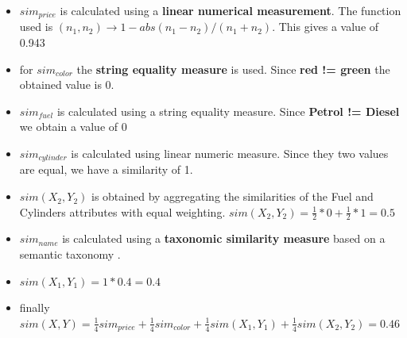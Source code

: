     \begin{itemize}
        \item $sim_{price}$ is calculated using a \textbf{linear numerical measurement}. The function used is $(n_1, n_2) \rightarrow 1 - abs(n_1 - n_2) / (n_1 + n_2)$. This gives a value of 0.943
        \item for $sim_{color}$ the \textbf{string equality measure} is used. Since \textbf{red != green} the obtained value is 0.
        \item $sim_{fuel}$ is calculated using a string equality measure. Since \textbf{Petrol != Diesel} we obtain a value of 0
        \item $sim_{cylinder}$ is calculated using linear numeric measure. Since they two values are equal, we have a similarity of 1.
        \item $sim(X_2, Y_2)$ is obtained by aggregating the similarities of the Fuel and Cylinders attributes with equal weighting. $sim(X_2, Y_2) = \frac{1}{2} * 0 + \frac{1}{2} * 1 = 0.5$
        \item $sim_{name}$ is calculated using a \textbf{taxonomic similarity measure} based on a semantic taxonomy \cite{malburg2021improving}.
        \item $sim(X_1, Y_1) = 1 * 0.4 = 0.4$
        \item finally $sim(X, Y) = \frac{1}{4} sim_{price} + \frac{1}{4} sim_{color} + \frac{1}{4} sim(X_1, Y_1) + \frac{1}{4} sim(X_2, Y_2) = 0.46$

    \end{itemize}

